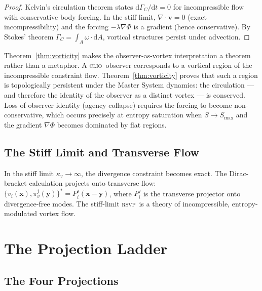 \documentclass[12pt, oneside]{book}
\theoremstyle{plain}
\theoremstyle{definition}
\newcommand{\vfield}{\mathbf{v}}
\newcommand{\RSVP}{\textsc{rsvp}}
\newcommand{\CLIO}{\textsc{clio}}
\newcommand{\dd}{\mathrm{d}}
\newcommand{\nab}{\nabla}
\begin{document}
\begin{proof}
Kelvin's circulation theorem states $\dd\Gamma_C/\dd t = 0$ for incompressible flow
with conservative body forcing. In the stiff limit, $\nab\cdot\vfield = 0$ (exact
incompressibility) and the forcing $-\lambda\nab\Phi$ is a gradient (hence
conservative). By Stokes' theorem $\Gamma_C = \int_A \omega\cdot\dd A$, vortical
structures persist under advection.
\end{proof}

Theorem~\ref{thm:vorticity} makes the observer-as-vortex interpretation a theorem
rather than a metaphor. A \CLIO\ observer corresponds to a vortical region of the
incompressible constraint flow. Theorem~\ref{thm:vorticity} proves that such a
region is topologically persistent under the Master System dynamics: the circulation
--- and therefore the identity of the observer as a distinct vortex --- is conserved.
Loss of observer identity (agency collapse) requires the forcing to become
non-conservative, which occurs precisely at entropy saturation when $S\to S_{\max}$
and the gradient $\nab\Phi$ becomes dominated by flat regions.

\section{The Stiff Limit and Transverse Flow}
\label{sec:stiff}

In the stiff limit $\kappa_v\to\infty$, the divergence constraint becomes exact.
The Dirac-bracket calculation projects onto transverse flow:
$\{v_i(\mathbf{x}),\pi^j_v(\mathbf{y})\}^* = P^j_i(\mathbf{x}-\mathbf{y})$,
where $P^j_i$ is the transverse projector onto divergence-free modes. The stiff-limit
\RSVP\ is a theory of incompressible, entropy-modulated vortex flow.

\chapter{The Projection Ladder}
\label{ch:projection}

\section{The Four Projections}
\label{sec:four}
\end{document}
